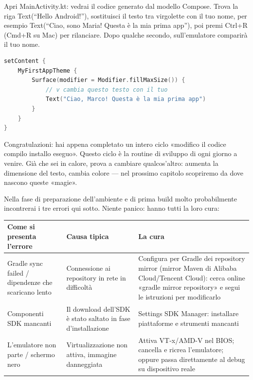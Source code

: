 
Apri MainActivity.kt: vedrai il codice generato dal modello Compose. Trova la riga Text(“Hello Android!”), sostituisci il testo tra virgolette con il tuo nome, per esempio Text(“Ciao, sono Maria! Questa è la mia prima app”), poi premi Ctrl+R (Cmd+R su Mac) per rilanciare. Dopo qualche secondo, sull'emulatore comparirà il tuo nome.

\begin{lstlisting}[language=Kotlin]
setContent {
    MyFirstAppTheme {
        Surface(modifier = Modifier.fillMaxSize()) {
            // v cambia questo testo con il tuo
            Text("Ciao, Marco! Questa è la mia prima app")
        }
    }
}
\end{lstlisting}

Congratulazioni: hai appena completato un intero ciclo «modifico il codice compilo installo eseguo». Questo ciclo è la routine di sviluppo di ogni giorno a venire. Già che sei in calore, prova a cambiare qualcos'altro: aumenta la dimensione del testo, cambia colore — nel prossimo capitolo scopriremo da dove nascono queste «magie».


Nella fase di preparazione dell'ambiente e di prima build molto probabilmente incontrerai i tre errori qui sotto. Niente panico: hanno tutti la loro cura:

\begin{center}
\begin{tabularx}{\linewidth}{|X|X|X|}
\hline
\textbf{Come si presenta l'errore} & \textbf{Causa tipica} & \textbf{La cura} \tabularnewline
\hline
Gradle sync failed / dipendenze che scaricano lento & Connessione ai repository in rete in difficoltà & Configura per Gradle dei repository mirror (mirror Maven di Alibaba Cloud/Tencent Cloud): cerca online «gradle mirror repository» e segui le istruzioni per modificarlo \tabularnewline
Componenti SDK mancanti & Il download dell'SDK è stato saltato in fase d'installazione & Settings SDK Manager: installare piattaforme e strumenti mancanti \tabularnewline
L'emulatore non parte / schermo nero & Virtualizzazione non attiva, immagine danneggiata & Attiva VT-x/AMD-V nel BIOS; cancella e ricrea l'emulatore; oppure passa direttamente al debug su dispositivo reale \tabularnewline
\hline
\end{tabularx}
\end{center}

